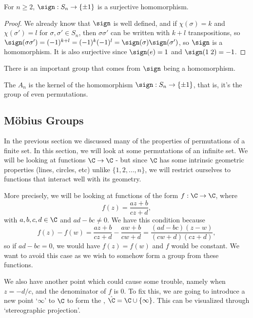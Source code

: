 \documentclass[a4paper]{scrartcl}
\newcommand{\newsection}{\subsection}
\begin{document}
\begin{proposition}
	For $n \geq 2$, $\sign : S_n \rightarrow \{\pm 1\}$ is a surjective homomorphism.
\end{proposition}
\begin{proof}
	We already know that $\sign$ is well defined, and if $\chi(\sigma) = k$ and $\chi(\sigma') = l$ for $\sigma, \sigma' \in S_n$, then $\sigma \sigma'$ can be written with $k + l$ transpositions, so $\sign(\sigma \sigma') = (-1)^{k + l} = (-1)^k (-1)^l = \sign(\sigma) \sign(\sigma')$, so $\sign$ is a homomorphism. It is also surjective since $\sign(e) = 1$ and $\sign(1\; 2) = -1$.
\end{proof}

There is an important group that comes from $\sign$ being a homomorphism.

\begin{definition}
	The  $A_n$ is the kernel of the homomorphism $\sign : S_n \rightarrow \{ \pm 1\}$, that is, it's the group of even permutations.
\end{definition}


\newsection{Möbius Groups}

In the previous section we discussed many of the properties of permutations of a finite set. In this section, we will look at some permutations of an infinite set. We will be looking at functions $\C \rightarrow \C$ - but since $\C$ has some intrinsic geometric properties (lines, circles, etc) unlike $\{1, 2, \dots, n\}$, we will restrict ourselves to functions that interact well with its geometry.

More precisely, we will be looking at functions of the form $f: \C \rightarrow \C$, where
$$
f(z) = \frac{az + b}{cz + d},
$$
with $a, b, c, d \in \C$ and $ad - bc \neq 0$. We have this condition because 
$$
f(z) - f(w) = \frac{az + b}{cz + d} - \frac{aw + b}{cw + d} = \frac{(ad - bc)(z - w)}{(cw + d)(cz + d)},
$$
so if $ad - bc = 0$, we would have $f(z) = f(w)$ and $f$ would be constant. We want to avoid this case as we wish to somehow form a group from these functions. 

We also have another point which could cause some trouble, namely when $z = -d/c$, and the denominator of $f$ is 0. To fix this, we are going to introduce a new point `$\infty$' to $\C$ to form the , $\hat{\C} = \C \cup \{ \infty \}$.  This can be visualized through `stereographic projection'.
\end{document}
